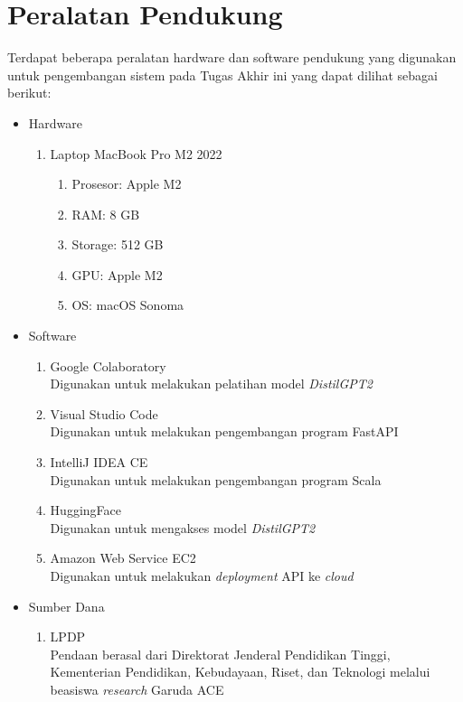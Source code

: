 \section{Peralatan Pendukung}
\label{sec:peralatan pendukung}

Terdapat beberapa peralatan hardware dan software pendukung yang digunakan untuk pengembangan sistem pada Tugas Akhir ini yang dapat dilihat sebagai berikut:
\begin{itemize}[topsep=0pt]
  \item Hardware
  \begin{enumerate}[topsep=0pt]
    \item Laptop MacBook Pro M2 2022
    \begin{enumerate}[topsep=0pt]
      \item Prosesor: Apple M2
      \item RAM: 8 GB
      \item Storage: 512 GB
      \item GPU: Apple M2
      \item OS: macOS Sonoma
    \end{enumerate}
  \end{enumerate}
  \item Software
  \begin{enumerate}[topsep=0pt]
    \item Google Colaboratory\\
    Digunakan untuk melakukan pelatihan model \emph{DistilGPT2}
    \item Visual Studio Code\\
    Digunakan untuk melakukan pengembangan program FastAPI
    \item IntelliJ IDEA CE\\
    Digunakan untuk melakukan pengembangan program Scala
    \item HuggingFace\\
    Digunakan untuk mengakses model \emph{DistilGPT2}
    \item Amazon Web Service EC2\\
    Digunakan untuk melakukan \emph{deployment} 
    API ke \emph{cloud}
  \end{enumerate}
  \item Sumber Dana
  \begin{enumerate}[topsep=0pt]
    \item LPDP\\  
    Pendaan berasal dari Direktorat Jenderal Pendidikan Tinggi,
    Kementerian Pendidikan, Kebudayaan, Riset, dan Teknologi
    melalui beasiswa \emph{research} Garuda ACE
  \end{enumerate}
\end{itemize}
